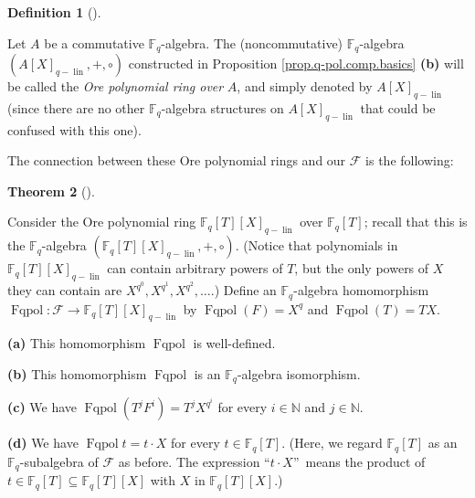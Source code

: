 \documentclass[numbers=enddot,12pt,final,onecolumn,notitlepage]{scrartcl}%
\theoremstyle{definition}
\newtheorem{theo}{Theorem}[section]
\newenvironment{theorem}[1][]
{\begin{theo}[#1]\begin{leftbar}}
{\end{leftbar}\end{theo}}
\newtheorem{defi}[theo]{Definition}
\newenvironment{definition}[1][]
{\begin{defi}[#1]\begin{leftbar}}
{\end{leftbar}\end{defi}}
\begin{document}
\begin{definition}
\label{def.q-pol.ring}Let $A$ be a commutative $\mathbb{F}_{q}$-algebra. The
(noncommutative) $\mathbb{F}_{q}$-algebra $\left(  A\left[  X\right]
_{q-\operatorname*{lin}},+,\circ\right)  $ constructed in Proposition
\ref{prop.q-pol.comp.basics} \textbf{(b)} will be called the \textit{Ore
polynomial ring over }$A$, and simply denoted by $A\left[  X\right]
_{q-\operatorname*{lin}}$ (since there are no other $\mathbb{F}_{q}$-algebra
structures on $A\left[  X\right]  _{q-\operatorname*{lin}}$ that could be
confused with this one).
\end{definition}

The connection between these Ore polynomial rings and our $\mathcal{F}$ is the following:

\begin{theorem}
\label{thm.q-pol.=F}Consider the Ore polynomial ring $\mathbb{F}_{q}\left[
T\right]  \left[  X\right]  _{q-\operatorname*{lin}}$ over $\mathbb{F}%
_{q}\left[  T\right]  $; recall that this is the $\mathbb{F}_{q}$-algebra
$\left(  \mathbb{F}_{q}\left[  T\right]  \left[  X\right]
_{q-\operatorname*{lin}},+,\circ\right)  $. (Notice that polynomials in
$\mathbb{F}_{q}\left[  T\right]  \left[  X\right]  _{q-\operatorname*{lin}}$
can contain arbitrary powers of $T$, but the only powers of $X$ they can
contain are $X^{q^{0}},X^{q^{1}},X^{q^{2}},\ldots$.) Define an $\mathbb{F}%
_{q}$-algebra homomorphism $\operatorname*{Fqpol}:\mathcal{F}\rightarrow
\mathbb{F}_{q}\left[  T\right]  \left[  X\right]  _{q-\operatorname*{lin}}$ by
$\operatorname*{Fqpol}\left(  F\right)  =X^{q}$ and $\operatorname*{Fqpol}%
\left(  T\right)  =TX$.

\textbf{(a)} This homomorphism $\operatorname*{Fqpol}$ is well-defined.

\textbf{(b)} This homomorphism $\operatorname*{Fqpol}$ is an $\mathbb{F}_{q}%
$-algebra isomorphism.

\textbf{(c)} We have $\operatorname*{Fqpol}\left(  T^{j}F^{i}\right)
=T^{j}X^{q^{i}}$ for every $i\in\mathbb{N}$ and $j\in\mathbb{N}$.

\textbf{(d)} We have $\operatorname*{Fqpol}t=t\cdot X$ for every
$t\in\mathbb{F}_{q}\left[  T\right]  $. (Here, we regard $\mathbb{F}%
_{q}\left[  T\right]  $ as an $\mathbb{F}_{q}$-subalgebra of $\mathcal{F}$ as
before. The expression \textquotedblleft$t\cdot X$\textquotedblright\ means
the product of $t\in\mathbb{F}_{q}\left[  T\right]  \subseteq\mathbb{F}%
_{q}\left[  T\right]  \left[  X\right]  $ with $X$ in $\mathbb{F}_{q}\left[
T\right]  \left[  X\right]  $.)
\end{theorem}
\end{document}
